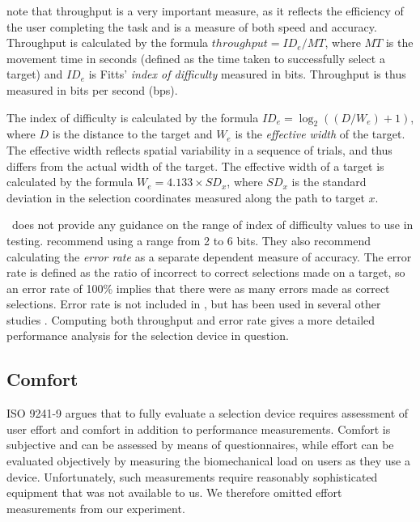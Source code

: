 \documentclass{elsart}
\begin{document}
\citet{Mack-IS-2001-EHCI} note that throughput is a very important
measure, as it reflects the efficiency of the user completing the task
and is a measure of both speed and accuracy. Throughput is calculated by
the formula \(\mathit{throughput} = \mathit{ID}_{e} / \mathit{MT}\),
where \(\mathit{MT}\) is the movement time in seconds (defined as the
time taken to successfully select a target) and \(\mathit{ID}_{e}\) is
Fitts' \citeyearpar{Fitt-PM-1954-Law} \emph{index of difficulty}
measured in bits. Throughput is thus measured in bits per second (bps).

The index of difficulty is calculated by the formula \(\mathit{ID}_{e} =
\log_{2}((D / W_{e}) + 1)\), where \(D\) is the distance to the target
and \(W_{e}\) is the \emph{effective width} of the target. The effective
width reflects spatial variability in a sequence of trials, and thus
differs from the actual width of the target. The effective width of a
target is calculated by the formula \(W_{e} = 4.133 \times
\mathit{SD}_{x}\), where \(\mathit{SD}_{x}\) is the standard deviation
in the selection coordinates measured along the path to target \(x\).

\ISOnine\ does not provide any guidance on the range of index of
difficulty values to use in testing. \citet{Doug-SA-1999-CHI} recommend
using a range from 2 to 6 bits. They also recommend calculating the
\emph{error rate} as a separate dependent measure of accuracy. The
error rate is defined as the ratio of incorrect to correct selections
made on a target, so an error rate of 100\% implies that there were as
many errors made as correct selections. Error rate is not included in
\ISOnine, but has been used in several other studies
\citep{Sear-A-1991-IJMMS,Sear-A-1993-BIT,Hara-H-1996,Bend-G-1999-PhD,
Doug-SA-1999-CHI,Mack-IS-2001-EHCI,Po-BA-2004-CHI}. Computing both
throughput and error rate gives a more detailed performance analysis for
the selection device in question.


\subsection{Comfort}
\label{sec-evaluation-comfort}

ISO 9241-9 argues that to fully evaluate a selection device requires
assessment of user effort and comfort in addition to performance
measurements. Comfort is subjective and can be assessed by means of
questionnaires, while effort can be evaluated objectively by measuring
the biomechanical load on users as they use a device. Unfortunately,
such measurements require reasonably sophisticated equipment
\citep{Doug-SA-1999-CHI} that was not available to us. We therefore
omitted effort measurements from our experiment.
\end{document}
